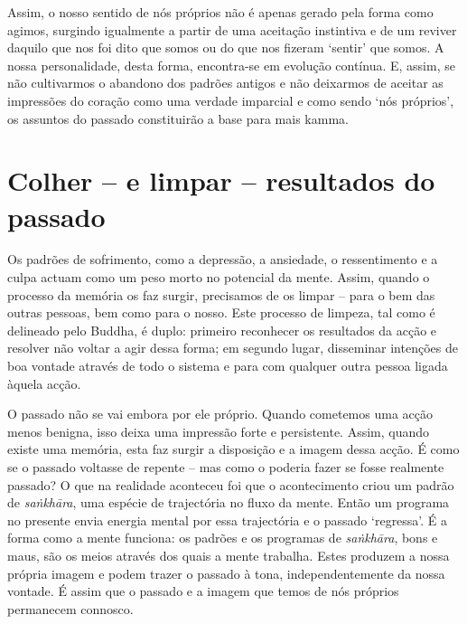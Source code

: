 Assim, o nosso sentido de nós próprios não é apenas gerado pela forma como agimos, surgindo igualmente a partir de uma aceitação instintiva e de um reviver daquilo que nos foi dito que somos ou do que nos fizeram `sentir' que somos. A nossa personalidade, desta forma, encontra-se em evolução contínua. E, assim, se não cultivarmos o abandono dos padrões antigos e não deixarmos de aceitar as impressões do coração como uma verdade imparcial e como sendo `nós próprios', os assuntos do passado constituirão a base para mais kamma.

\section{Colher -- e limpar -- resultados do passado}

Os padrões de sofrimento, como a depressão, a ansiedade, o ressentimento e a culpa actuam como um peso morto no potencial da mente. Assim, quando o processo da memória os faz surgir, precisamos de os limpar -- para o bem das outras pessoas, bem como para o nosso. Este processo de limpeza, tal como é delineado pelo Buddha, é duplo: primeiro reconhecer os resultados da acção e resolver não voltar a agir dessa forma; em segundo lugar, disseminar intenções de boa vontade através de todo o sistema e para com qualquer outra pessoa ligada àquela acção.

O passado não se vai embora por ele próprio. Quando cometemos uma acção menos benigna, isso deixa uma impressão forte e persistente. Assim, quando existe uma memória, esta faz surgir a disposição e a imagem dessa acção. É como se o passado voltasse de repente -- mas como o poderia fazer se fosse realmente passado? O que na realidade aconteceu foi que o acontecimento criou um padrão de \emph{saṅkhāra}, uma espécie de trajectória no fluxo da mente. Então um programa no presente envia energia mental por essa trajectória e o passado `regressa'. É a forma como a mente funciona: os padrões e os programas de \emph{saṅkhāra}, bons e maus, são os meios através dos quais a mente trabalha. Estes produzem a nossa própria imagem e podem trazer o passado à tona, independentemente da nossa vontade. É assim que o passado e a imagem que temos de nós próprios permanecem connosco.

